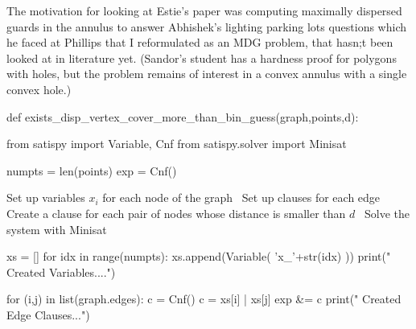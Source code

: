 The motivation for looking at Estie's paper was computing maximally dispersed guards in the annulus to answer Abhishek's
lighting parking lots questions which he faced at Phillips that I reformulated as an MDG problem, that hasn;t been looked
at in literature yet. (Sandor's student has a hardness proof for polygons with holes, but the problem remains of interest
in a convex annulus with a single convex hole.)


\nwenddocs{}\plusendmoddef\nwstartdeflinemarkup{}\nwenddeflinemarkup
def exists_disp_vertex_cover_more_than_bin_guess(graph,points,d):

     from satispy import Variable, Cnf
     from satispy.solver import Minisat

     numpts = len(points)
     exp    = Cnf()

     \LA{}Set up variables $x_i$ for each node of the graph~{\nwtagstyle{}}\RA{}
     \LA{}Set up clauses for each edge~{\nwtagstyle{}}\RA{}
     \LA{}Create a clause for each pair of nodes whose distance is smaller than $d$~{\nwtagstyle{}}\RA{}
     \LA{}Solve the system with Minisat~{\nwtagstyle{}}\RA{}
\nwendcode{}\nwdocspar


\nwenddocs{}\endmoddef\nwstartdeflinemarkup{}\nwenddeflinemarkup
xs = []
for idx in range(numpts):
    xs.append(Variable( 'x_'+str(idx) ))
print("     Created Variables....")
\nwendcode{}\nwdocspar


\nwenddocs{}\endmoddef\nwstartdeflinemarkup{}\nwenddeflinemarkup
for (i,j) in  list(graph.edges):
      c = Cnf()
      c = xs[i] | xs[j]
      exp &= c
print("     Created Edge Clauses...")
\nwendcode{}\nwdocspar




